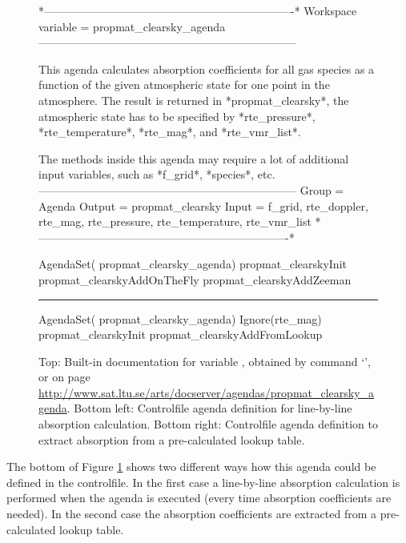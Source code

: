 \begin{figure}
\begin{code}
*-------------------------------------------------------------------*
Workspace variable = propmat_clearsky_agenda
---------------------------------------------------------------------

This agenda calculates absorption coefficients for all gas species
as a function of the given atmospheric state for one point in the
atmosphere. The result is returned in *propmat_clearsky*, the
atmospheric state has to be specified by *rte_pressure*,
*rte_temperature*, *rte_mag*, and *rte_vmr_list*.

The methods inside this agenda may require a lot of additional
input variables, such as *f_grid*, *species*, etc.
---------------------------------------------------------------------
Group  = Agenda
Output = propmat_clearsky
Input  = f_grid, rte_doppler, rte_mag, rte_pressure,
         rte_temperature, rte_vmr_list
*-------------------------------------------------------------------*
\end{code}
\begin{minipage}[t]{0.48\hsize}
\begin{code}
AgendaSet(
propmat_clearsky_agenda)
{
  propmat_clearskyInit
  propmat_clearskyAddOnTheFly
  propmat_clearskyAddZeeman
}
\end{code}
\end{minipage}
\hspace*{\fill}
\rule[-75pt]{.5pt}{85pt}
\hspace*{\fill}
\begin{minipage}[t]{0.48\hsize}
\begin{code}
AgendaSet(
propmat_clearsky_agenda)
{
  Ignore(rte_mag)
  propmat_clearskyInit
  propmat_clearskyAddFromLookup
}
\end{code}
\end{minipage}
\caption{Top: Built-in documentation for variable
  , obtained by command
  `', or on page
  \url{http://www.sat.ltu.se/arts/docserver/agendas/propmat_clearsky_agenda}. Bottom
  left: Controlfile agenda definition for line-by-line absorption
  calculation. Bottom right: Controlfile agenda definition to extract
  absorption from a pre-calculated lookup table.}
\label{fig:agendas}
\end{figure}

The bottom of Figure \ref{fig:agendas} shows two different ways how this agenda
could be defined in the controlfile. In the first case a line-by-line
absorption calculation is performed when the agenda is executed (every time
absorption coefficients are needed). In the second case the absorption
coefficients are extracted from a pre-calculated lookup table.

